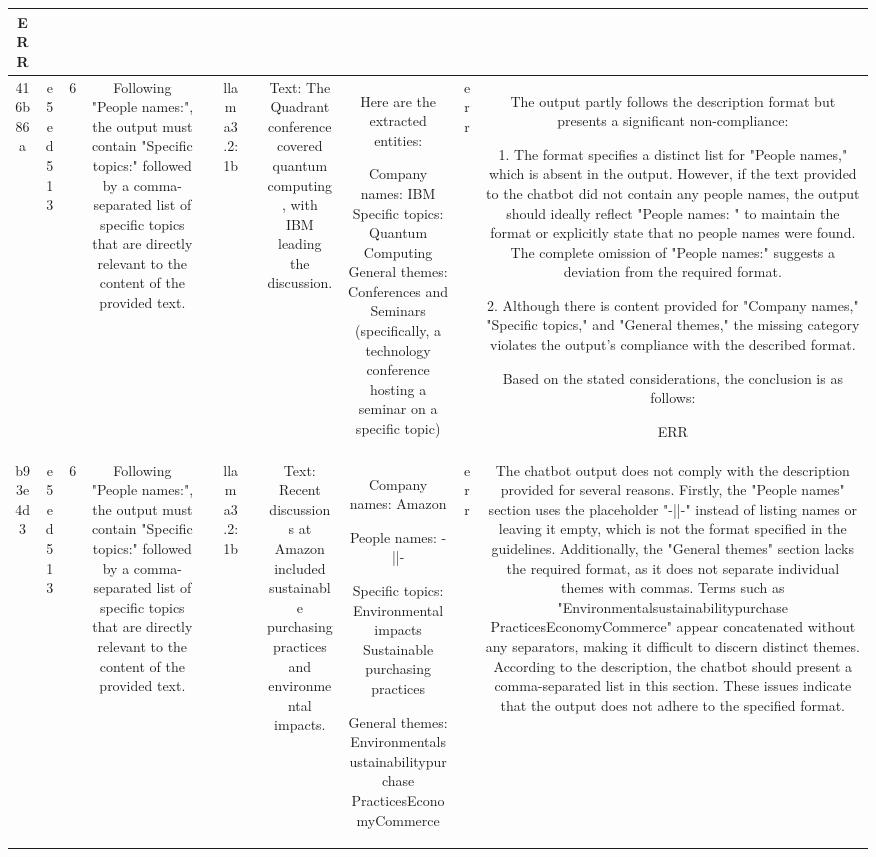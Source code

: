 \begin{table}[h!]
\begin{tabular}{|c|c|c|c|c|c|c|c|c|c|c|}
ERR\\
\hline
416b86a & e5ed513 & 6 & Following "People names:", the output must contain "Specific topics:" followed by a comma-separated list of specific topics that are directly relevant to the content of the provided text. &  & llama3.2:1b &  & Text: The Quadrant conference covered quantum computing, with IBM leading the discussion. & Here are the extracted entities:

Company names: IBM
Specific topics: Quantum Computing
General themes: Conferences and Seminars (specifically, a technology conference hosting a seminar on a specific topic) & err & The output partly follows the description format but presents a significant non-compliance: 

1. The format specifies a distinct list for "People names," which is absent in the output. However, if the text provided to the chatbot did not contain any people names, the output should ideally reflect "People names: " to maintain the format or explicitly state that no people names were found. The complete omission of "People names:" suggests a deviation from the required format.

2. Although there is content provided for "Company names," "Specific topics," and "General themes," the missing category violates the output's compliance with the described format.

Based on the stated considerations, the conclusion is as follows:

ERR\\
\hline
b93e4d3 & e5ed513 & 6 & Following "People names:", the output must contain "Specific topics:" followed by a comma-separated list of specific topics that are directly relevant to the content of the provided text. &  & llama3.2:1b &  & Text: Recent discussions at Amazon included sustainable purchasing practices and environmental impacts. & Company names: 
Amazon

People names: -||-

Specific topics:
Environmental impacts
Sustainable purchasing practices

General themes:
Environmentalsustainabilitypurchase PracticesEconomyCommerce & err & The chatbot output does not comply with the description provided for several reasons. Firstly, the "People names" section uses the placeholder "-||-" instead of listing names or leaving it empty, which is not the format specified in the guidelines. Additionally, the "General themes" section lacks the required format, as it does not separate individual themes with commas. Terms such as "Environmentalsustainabilitypurchase PracticesEconomyCommerce" appear concatenated without any separators, making it difficult to discern distinct themes. According to the description, the chatbot should present a comma-separated list in this section. These issues indicate that the output does not adhere to the specified format.


\end{tabular}
\end{table}
